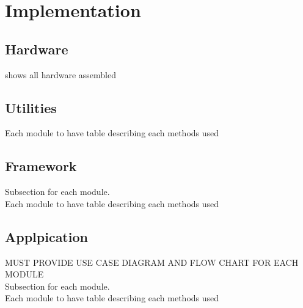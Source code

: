\chapter{Implementation}
\section{Hardware}
shows all hardware assembled

\section{Utilities}
Each module to have table describing each methods used\\

\section{Framework}
Subsection for each module.\\
Each module to have table describing each methods used\\

\section{Applpication}
MUST PROVIDE USE CASE DIAGRAM AND FLOW CHART FOR EACH MODULE\\
Subsection for each module.\\
Each module to have table describing each methods used\\